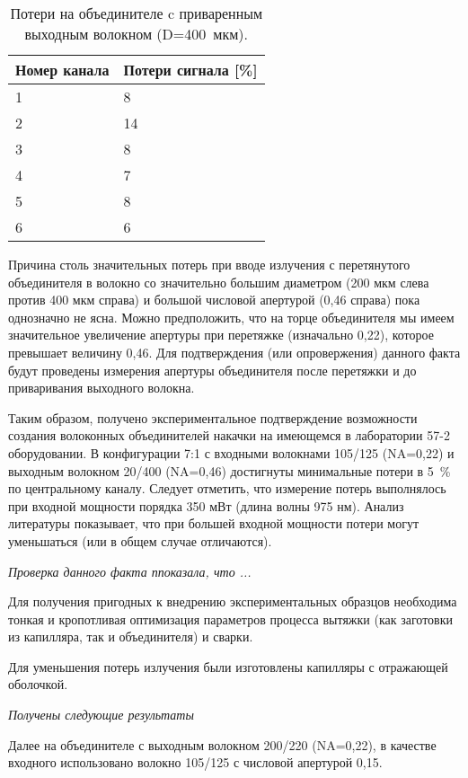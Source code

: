 \begin{table} [htbp]
  \centering
  \parbox{16cm}{\caption{Потери на объединителе c приваренным выходным волокном (D=400~мкм).}\label{tbl:comb_res_2}}
  \begin{tabular}{| p{3cm} | p{4cm} |}
  \hline
  \hline
  Номер канала & Потери сигнала [\%] \\
  \hline
  1 & 8 \\
  2 & 14  \\
  3 & 8  \\
  4 & 7  \\
  5 & 8  \\
  6 & 6  \\
  \hline
  \hline
  \end{tabular}
\end{table}

Причина столь значительных потерь при вводе излучения с перетянутого объединителя в волокно со значительно большим диаметром (200 мкм слева против 400 мкм справа) и большой числовой апертурой (0,46 справа) пока однозначно не ясна. Можно предположить, что на торце объединителя мы имеем значительное увеличение апертуры при перетяжке (изначально 0,22), которое превышает величину 0,46. Для подтверждения (или опровержения) данного факта будут проведены измерения апертуры объединителя после перетяжки и до приваривания выходного волокна.

Таким образом, получено экспериментальное подтверждение возможности создания волоконных объединителей накачки на имеющемся в лаборатории 57-2 оборудовании. В конфигурации 7:1 с входными волокнами 105/125 (NA=0,22) и выходным волокном 20/400 (NA=0,46) достигнуты минимальные потери в 5~\% по центральному каналу. Следует отметить, что измерение потерь выполнялось при входной мощности порядка 350 мВт (длина волны 975 нм). Анализ литературы показывает, что при большей входной мощности потери могут уменьшаться (или в общем случае отличаются).

\textit{Проверка данного факта ппоказала, что ...}

Для получения пригодных к внедрению экспериментальных образцов необходима тонкая и кропотливая оптимизация параметров процесса вытяжки (как заготовки из капилляра, так и объединителя) и сварки.

Для уменьшения потерь излучения были изготовлены капилляры с отражающей оболочкой.

\textit{Получены следующие результаты}

Далее на объединителе с выходным волокном 200/220 (NA=0,22), в качестве входного использовано волокно 105/125 с числовой апертурой 0,15.

